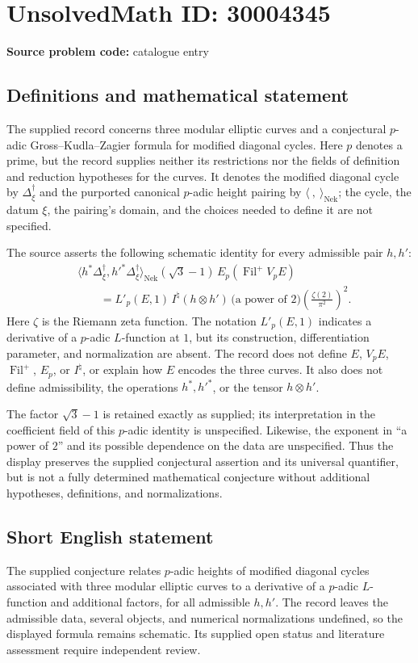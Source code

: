 \documentclass[11pt]{article}
\begin{document}
\section*{UnsolvedMath ID: 30004345}
\textbf{Source problem code:} catalogue entry
\subsection{Definitions and mathematical statement}
The supplied record concerns three modular elliptic curves and a conjectural \(p\)-adic Gross--Kudla--Zagier formula for modified diagonal cycles. Here \(p\) denotes a prime, but the record supplies neither its restrictions nor the fields of definition and reduction hypotheses for the curves. It denotes the modified diagonal cycle by \(\Delta^\dagger_\xi\) and the purported canonical \(p\)-adic height pairing by \(\langle\ ,\ \rangle_{\mathrm{Nek}}\); the cycle, the datum \(\xi\), the pairing's domain, and the choices needed to define it are not specified.

The source asserts the following schematic identity for every admissible pair \(h,h'\):
\[
\begin{aligned}
&\bigl\langle h^*\Delta^\dagger_\xi,
                 h'^*\Delta^\dagger_\xi\bigr\rangle_{\mathrm{Nek}}
 (\sqrt{3}-1)\,
 E_p\!\left(\operatorname{Fil}^+V_pE\right)
\\
&\qquad = L'_p(E,1)\,
 I^\natural(h\otimes h')\,
 \bigl(\text{a power of }2\bigr)
 \left(\frac{\zeta(2)}{\pi^2}\right)^2.
\end{aligned}
\]
Here \(\zeta\) is the Riemann zeta function. The notation \(L'_p(E,1)\) indicates a derivative of a \(p\)-adic \(L\)-function at \(1\), but its construction, differentiation parameter, and normalization are absent. The record does not define \(E\), \(V_pE\), \(\operatorname{Fil}^+\), \(E_p\), or \(I^\natural\), or explain how \(E\) encodes the three curves. It also does not define admissibility, the operations \(h^*,h'^*\), or the tensor \(h\otimes h'\).

The factor \(\sqrt{3}-1\) is retained exactly as supplied; its interpretation in the coefficient field of this \(p\)-adic identity is unspecified. Likewise, the exponent in ``a power of \(2\)'' and its possible dependence on the data are unspecified. Thus the display preserves the supplied conjectural assertion and its universal quantifier, but is not a fully determined mathematical conjecture without additional hypotheses, definitions, and normalizations.
\subsection{Short English statement}
The supplied conjecture relates \(p\)-adic heights of modified diagonal cycles associated with three modular elliptic curves to a derivative of a \(p\)-adic \(L\)-function and additional factors, for all admissible \(h,h'\). The record leaves the admissible data, several objects, and numerical normalizations undefined, so the displayed formula remains schematic. Its supplied open status and literature assessment require independent review.
\end{document}
